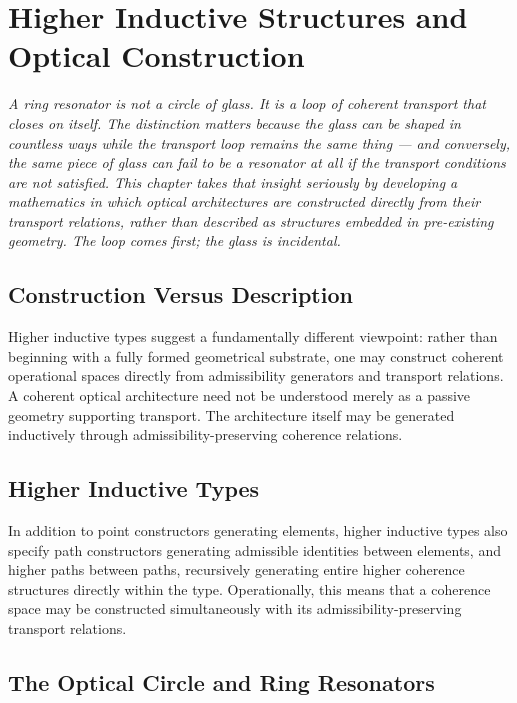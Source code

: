 \documentclass[11pt,openany]{book}
\theoremstyle{definition}
\theoremstyle{plain}
\begin{document}

\chapter{Higher Inductive Structures and Optical Construction}

\noindent\textit{A ring resonator is not a circle of glass. It is a loop of coherent transport that closes on itself. The distinction matters because the glass can be shaped in countless ways while the transport loop remains the same thing --- and conversely, the same piece of glass can fail to be a resonator at all if the transport conditions are not satisfied. This chapter takes that insight seriously by developing a mathematics in which optical architectures are constructed directly from their transport relations, rather than described as structures embedded in pre-existing geometry. The loop comes first; the glass is incidental.}

\bigskip

\section{Construction Versus Description}

Higher inductive types suggest a fundamentally different viewpoint: rather than beginning with a fully formed geometrical substrate, one may construct coherent operational spaces directly from admissibility generators and transport relations. A coherent optical architecture need not be understood merely as a passive geometry supporting transport. The architecture itself may be generated inductively through admissibility-preserving coherence relations.

\section{Higher Inductive Types}

In addition to point constructors generating elements, higher inductive types also specify path constructors generating admissible identities between elements, and higher paths between paths, recursively generating entire higher coherence structures directly within the type. Operationally, this means that a coherence space may be constructed simultaneously with its admissibility-preserving transport relations.

\section{The Optical Circle and Ring Resonators}
\end{document}
